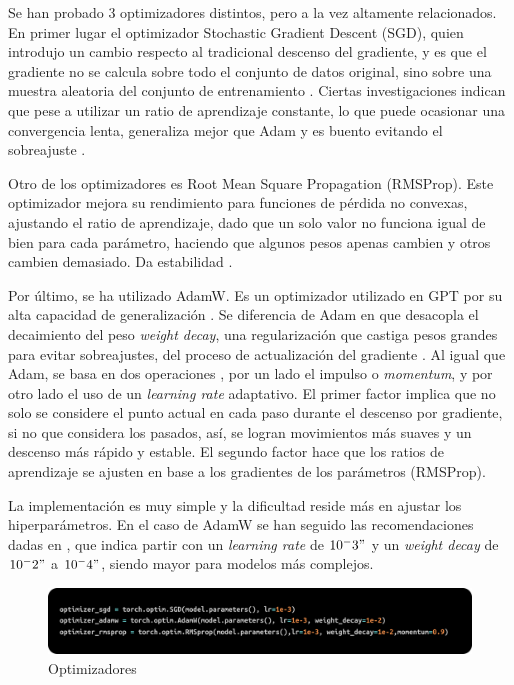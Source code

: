\documentclass[11pt]{book}
\begin{document}
Se han probado 3 optimizadores distintos, pero a la vez altamente relacionados. En primer lugar el optimizador Stochastic Gradient Descent (SGD), quien introdujo un cambio respecto al tradicional descenso del gradiente, y es que el gradiente no se calcula sobre todo el conjunto de datos original, sino sobre una muestra aleatoria del conjunto de entrenamiento \parencite{geeksforgeeks_sgd}. Ciertas investigaciones indican que pese a utilizar un ratio de aprendizaje constante, lo que puede ocasionar una convergencia lenta, generaliza mejor que Adam y es buento evitando el sobreajuste \parencite{ultralytics_adam_glossary}. 

Otro de los optimizadores es Root Mean Square Propagation (RMSProp). Este optimizador mejora su rendimiento para funciones de pérdida no convexas, ajustando el ratio de aprendizaje, dado que un solo valor no funciona igual de bien para cada parámetro, haciendo que algunos pesos apenas cambien y otros cambien demasiado. Da estabilidad \parencite{kashyap2024rmsprop}.

Por último, se ha utilizado AdamW. Es un optimizador utilizado en GPT por su alta capacidad de generalización . Se diferencia de Adam en que desacopla el decaimiento del peso \textit{weight decay}, una regularización que castiga pesos grandes para evitar sobreajustes, del proceso de actualización del gradiente \parencite{datacamp_adamw_pytorch}.  Al igual que Adam, se basa en dos operaciones \parencite{yassin2024adamvsadamw}, por un lado el impulso o \textit{momentum}, y por otro lado el uso de un \textit{learning rate} adaptativo. El primer factor implica que no solo se considere el punto actual en cada paso durante el descenso por gradiente, si no que considera los pasados, así, se logran movimientos más suaves y un descenso más rápido y estable. El segundo factor hace que los ratios de aprendizaje se ajusten en base a los gradientes de los parámetros (RMSProp).

La implementación es muy simple y la dificultad reside más en ajustar los hiperparámetros. En el caso de AdamW se han seguido las recomendaciones dadas en \parencite{datacamp_adamw_pytorch}, que indica partir con un \textit{learning rate} de $10^-3"$ y un \textit{weight decay} de $10^-2"$ a $10^-4"$, siendo mayor para modelos más complejos. 


\begin{figure}[h]
    \centering
    \includegraphics[width=0.5\linewidth]{img/optimizers.png}
    \caption{Optimizadores \parencite{stackoverflow_sgd_optimizer}}
    \label{fig:placeholder22}
\end{figure}
\end{document}
